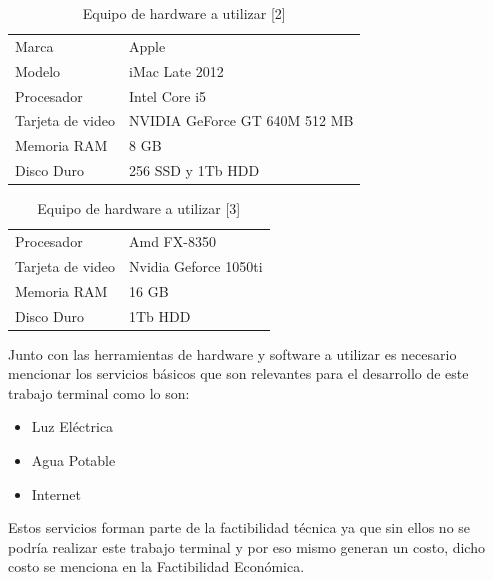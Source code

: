 \documentclass[12pt, a4paper, titlepage]{report}
\begin{document}
    	\begin{table}[H]
    		\begin{tabular}{ |p{3.5cm}|p{9.5cm}|}
    			\hline
    			\rowcolor{guindapoli}
    			\multicolumn{2}{|c|}{\textbf{\textcolor{white}{Equipo de hardware [2]}}}\\
    			\hline
    			\rowcolor{azulfuerte}Marca & Apple\\
    			\hline
    			\cellcolor{azulclaro}Modelo &  iMac Late 2012\\ 
    			\hline
    			\cellcolor{azulclaro}Procesador &
    			Intel Core i5\\
    			\hline
    			\cellcolor{azulclaro}Tarjeta de video & 
    			NVIDIA GeForce GT 640M 512 MB\\
    			\hline
    			\cellcolor{azulclaro}Memoria RAM &
    			8 GB\\
    			\hline
    			\cellcolor{azulclaro}Disco Duro &
    			256 SSD y 1Tb HDD\\
    			\hline
    		\end{tabular}
    		\caption[Equipo de Hardware 2]{Equipo de hardware a utilizar [2]}
    	\end{table}
    	\begin{table}[H]
    		\begin{tabular}{ |p{3.5cm}|p{9.5cm}|}
    			\hline
    			\rowcolor{guindapoli}
    			\multicolumn{2}{|c|}{\textbf{\textcolor{white}{Equipo de hardware [3]}}}\\
    			\hline
    			\cellcolor{azulclaro}Procesador &
    			Amd FX-8350\\
    			\hline
    			\cellcolor{azulclaro}Tarjeta de video & 
    			Nvidia Geforce 1050ti\\
    			\hline
    			\cellcolor{azulclaro}Memoria RAM &
    			16 GB\\
    			\hline
    			\cellcolor{azulclaro}Disco Duro &
    			1Tb HDD\\
    			\hline
    		\end{tabular}
    		\caption[Equipo de Hardware 3]{Equipo de hardware a utilizar [3]}
    	\end{table}
    	Junto con las herramientas de hardware y software a utilizar es necesario mencionar los servicios b\'asicos que son relevantes para el desarrollo de este trabajo terminal como lo son:
    	\begin{itemize}
    		\item Luz Eléctrica
    		\item Agua Potable
    		\item Internet
    	\end{itemize}
    	Estos servicios forman parte de la factibilidad técnica ya que sin ellos no se podría realizar este trabajo terminal y por eso mismo generan un costo, dicho costo se menciona en la Factibilidad Económica.
    	
\end{document}

